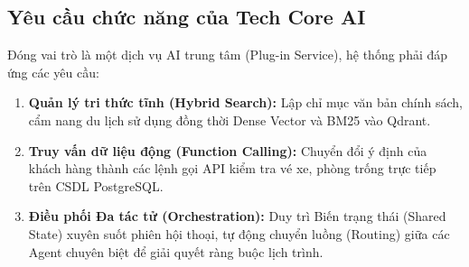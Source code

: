 \subsection{Yêu cầu chức năng của Tech Core AI}
Đóng vai trò là một dịch vụ AI trung tâm (Plug-in Service), hệ thống phải đáp ứng các yêu cầu:
\begin{enumerate}
    \item \textbf{Quản lý tri thức tĩnh (Hybrid Search):} Lập chỉ mục văn bản chính sách, cẩm nang du lịch sử dụng đồng thời Dense Vector và BM25 vào Qdrant.
    \item \textbf{Truy vấn dữ liệu động (Function Calling):} Chuyển đổi ý định của khách hàng thành các lệnh gọi API kiểm tra vé xe, phòng trống trực tiếp trên CSDL PostgreSQL.
    \item \textbf{Điều phối Đa tác tử (Orchestration):} Duy trì Biến trạng thái (Shared State) xuyên suốt phiên hội thoại, tự động chuyển luồng (Routing) giữa các Agent chuyên biệt để giải quyết ràng buộc lịch trình.
\end{enumerate}
